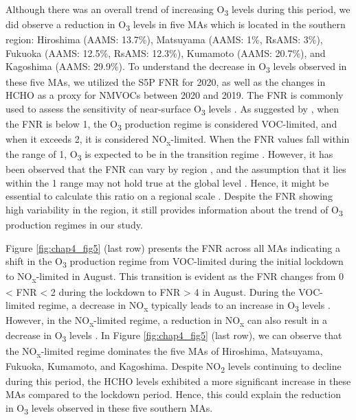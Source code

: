 Although there was an overall trend of increasing O\textsubscript{3} levels during this period, we did observe a reduction in O\textsubscript{3} levels in five MAs which is located in the southern region: Hiroshima (AAMS: 13.7\%), Matsuyama (AAMS: 1\%, RsAMS: 3\%), Fukuoka (AAMS: 12.5\%, RsAMS: 12.3\%), Kumamoto (AAMS: 20.7\%), and Kagoshima (AAMS: 29.9\%). To understand the decrease in O\textsubscript{3} levels observed in these five MAs, we utilized the S5P FNR for 2020, as well as the changes in HCHO as a proxy for NMVOCs between 2020 and 2019. The FNR is commonly used to assess the sensitivity of near-surface O\textsubscript{3} levels \citep{martin2004space}. As suggested by \citep{duncan2010application}, when the FNR is below 1, the O\textsubscript{3} production regime is considered VOC-limited, and when it exceeds 2, it is considered NO\textsubscript{x}-limited. When the FNR values fall within the range of 1, O\textsubscript{3} is expected to be in the transition regime \citep{duncan2010application}. However, it has been observed that the FNR can vary by region \citep{jin2020inferring,irie2021continuous,souri2023characterization,ren2022diagnosing}, and the assumption that it lies within the 1 range may not hold true at the global level \citep{schroeder2017new}. Hence, it might be essential to calculate this ratio on a regional scale \citep{damiani2022peculiar,schroeder2017new}. Despite the FNR showing high variability in the region, it still provides information about the trend of O\textsubscript{3} production regimes in our study. \par
Figure \ref{fig:chap4_fig5} (last row) presents the FNR across all MAs indicating a shift in the O\textsubscript{3} production regime from VOC-limited during the initial lockdown to NO\textsubscript{x}-limited in August. This transition is evident as the FNR changes from 0 < FNR < 2 during the lockdown to FNR > 4 in August. During the VOC-limited regime, a decrease in NO\textsubscript{x} typically leads to an increase in O\textsubscript{3} levels \citep{duncan2010application}. However, in the NO\textsubscript{x}-limited regime, a reduction in NO\textsubscript{x} can also result in a decrease in O\textsubscript{3} levels \citep{duncan2010application}. In Figure \ref{fig:chap4_fig5} (last row), we can observe that the NO\textsubscript{x}-limited regime dominates the five MAs of Hiroshima, Matsuyama, Fukuoka, Kumamoto, and Kagoshima. Despite NO\textsubscript{2} levels continuing to decline during this period, the HCHO levels exhibited a more significant increase in these MAs compared to the lockdown period. Hence, this could explain the reduction in O\textsubscript{3} levels observed in these five southern MAs. \par
